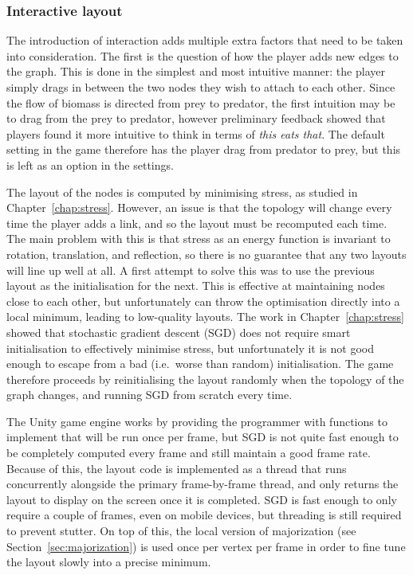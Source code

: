\subsubsection{Interactive layout}
\label{sec:ecobuilder_layout}
The introduction of interaction adds multiple extra factors that need to be taken into consideration.
The first is the question of how the player adds new edges to the graph. This is done in the simplest and most intuitive manner: the player simply drags in between the two nodes they wish to attach to each other. Since the flow of biomass is directed from prey to predator, the first intuition may be to drag from the prey to predator, however preliminary feedback showed that players found it more intuitive to think in terms of \emph{this eats that}. The default setting in the game therefore has the player drag from predator to prey, but this is left as an option in the settings.

The layout of the nodes is computed by minimising stress, as studied in Chapter~\ref{chap:stress}.
However, an issue is that the topology will change every time the player adds a link, and so the layout must be recomputed each time.
The main problem with this is that stress as an energy function is invariant to rotation, translation, and reflection, so there is no guarantee that any two layouts will line up well at all.
A first attempt to solve this was to use the previous layout as the initialisation for the next. This is effective at maintaining nodes close to each other, but unfortunately can throw the optimisation directly into a local minimum, leading to low-quality layouts. The work in Chapter~\ref{chap:stress} showed that stochastic gradient descent (SGD) does not require smart initialisation to effectively minimise stress, but unfortunately it is not good enough to escape from a bad (i.e.\ worse than random) initialisation.
The game therefore proceeds by reinitialising the layout randomly when the topology of the graph changes, and running SGD from scratch every time. 

The Unity game engine works by providing the programmer with functions to implement that will be run once per frame, but SGD is not quite fast enough to be completely computed every frame and still maintain a good frame rate.
Because of this, the layout code is implemented as a thread that runs concurrently alongside the primary frame-by-frame thread, and only returns the layout to display on the screen once it is completed. SGD is fast enough to only require a couple of frames, even on mobile devices, but threading is still required to prevent stutter.
On top of this, the local version of majorization (see Section~\ref{sec:majorization}) is used once per vertex per frame in order to fine tune the layout slowly into a precise minimum.

